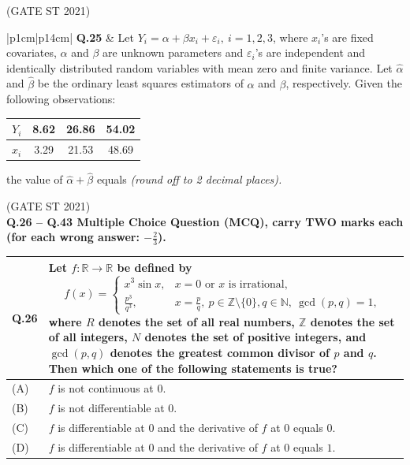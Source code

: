 \documentclass[journal,12pt,onecolumn]{IEEEtran}
\theoremstyle{remark}
\begin{document}
\bigskip
\hfill (GATE ST 2021)
\\
\begin{tabular}{|p{1cm}|p{14cm}|}
\hline
\textbf{Q.25} &
Let $Y_i = \alpha + \beta x_i + \varepsilon_i,\ i = 1,2,3$, where $x_i$'s are fixed covariates, $\alpha$ and $\beta$ are unknown parameters and $\varepsilon_i$'s are independent and identically distributed random variables with mean zero and finite variance. Let $\hat{\alpha}$ and $\hat{\beta}$ be the ordinary least squares estimators of $\alpha$ and $\beta$, respectively. Given the following observations:

\begin{center}
\begin{tabular}{|c|c|c|c|}
\hline
$Y_i$ & 8.62 & 26.86 & 54.02 \\
\hline
$x_i$ & 3.29 & 21.53 & 48.69 \\
\hline
\end{tabular}
\end{center}

the value of $\hat{\alpha} + \hat{\beta}$ equals \textit{(round off to 2 decimal places).}\\
\hline
\end{tabular}

\bigskip
\hfill (GATE ST 2021)
\\

\textbf{Q.26 -- Q.43 Multiple Choice Question (MCQ), carry TWO marks each (for each wrong answer: $-\frac{2}{3}$).}
\begin{tabular}{|p{1cm}|p{14cm}|}
\hline
\textbf{Q.26} &
Let $f: \mathbb{R} \to \mathbb{R}$ be defined by
$$
f(x) = 
\begin{cases}
x^{3} \sin x, & x=0 \text{ or } x \text{ is irrational}, \\
\frac{p^{3}}{q^{3}}, & x = \frac{p}{q},\ p \in \mathbb{Z} \setminus \{0\}, q \in \mathbb{N},\ \gcd(p,q) = 1,
\end{cases}
$$
where $R$ denotes the set of all real numbers, $\mathbb{Z}$ denotes the set of all integers, $N$ denotes the set of positive integers, and $\gcd(p,q)$ denotes the greatest common divisor of $p$ and $q$. Then which one of the following statements is true?\\
\hline

(A) & $f$ is not continuous at $0$.\\
\hline
(B) & $f$ is not differentiable at $0$.\\
\hline
(C) & $f$ is differentiable at $0$ and the derivative of $f$ at $0$ equals $0$.\\
\hline
(D) & $f$ is differentiable at $0$ and the derivative of $f$ at $0$ equals $1$.\\
\hline
\end{tabular}
\end{document}
